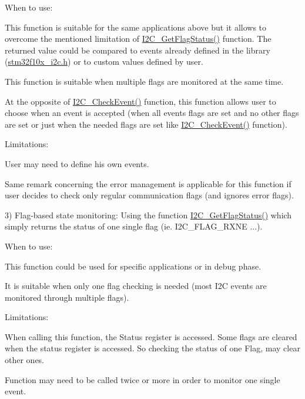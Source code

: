 When to use\+:
\begin{DoxyItemize}
\item This function is suitable for the same applications above but it allows to overcome the mentioned limitation of \hyperlink{group___i2_c___private___functions_ga15c95d0ed124f029621a2061b1677ee7}{I2\+C\+\_\+\+Get\+Flag\+Status()} function. The returned value could be compared to events already defined in the library (\hyperlink{stm32f10x__i2c_8h}{stm32f10x\+\_\+i2c.\+h}) or to custom values defined by user.
\item This function is suitable when multiple flags are monitored at the same time.
\item At the opposite of \hyperlink{group___i2_c___private___functions_ga2d5701342f9d4c1f09bf9d3cdcacc326}{I2\+C\+\_\+\+Check\+Event()} function, this function allows user to choose when an event is accepted (when all events flags are set and no other flags are set or just when the needed flags are set like \hyperlink{group___i2_c___private___functions_ga2d5701342f9d4c1f09bf9d3cdcacc326}{I2\+C\+\_\+\+Check\+Event()} function).
\end{DoxyItemize}

Limitations\+:
\begin{DoxyItemize}
\item User may need to define his own events.
\item Same remark concerning the error management is applicable for this function if user decides to check only regular communication flags (and ignores error flags).
\end{DoxyItemize}

3) Flag-\/based state monitoring\+: Using the function \hyperlink{group___i2_c___private___functions_ga15c95d0ed124f029621a2061b1677ee7}{I2\+C\+\_\+\+Get\+Flag\+Status()} which simply returns the status of one single flag (ie. I2\+C\+\_\+\+F\+L\+A\+G\+\_\+\+R\+X\+NE ...).
\begin{DoxyItemize}
\item When to use\+:
\begin{DoxyItemize}
\item This function could be used for specific applications or in debug phase.
\item It is suitable when only one flag checking is needed (most I2C events are monitored through multiple flags).
\end{DoxyItemize}
\item Limitations\+:
\begin{DoxyItemize}
\item When calling this function, the Status register is accessed. Some flags are cleared when the status register is accessed. So checking the status of one Flag, may clear other ones.
\item Function may need to be called twice or more in order to monitor one single event.
\end{DoxyItemize}
\end{DoxyItemize}

